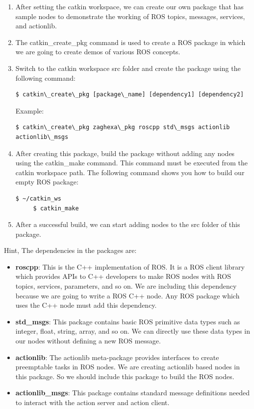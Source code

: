  \begin{enumerate}
 	\item After setting the catkin workspace, we can create our own package that has sample nodes to demonstrate the working of ROS topics, messages, services, and actionlib.
 	\item The catkin\_create\_pkg command is used to create a ROS package in which we are going to create demos of various ROS concepts.
 	\item Switch to the catkin workspace src folder and create the package using the following command: 
     \begin{lstlisting}[language=terCmd]
    $ catkin\_create\_pkg [package\_name] [dependency1] [dependency2]
     \end{lstlisting}
     Example:
      \begin{lstlisting}[language=terCmd]
 $ catkin\_create\_pkg zaghexa\_pkg roscpp std\_msgs actionlib actionlib\_msgs
     \end{lstlisting}

 	\item After creating this package, build the package without adding any nodes using the catkin\_make command. This command must be executed from the catkin workspace path. The following command shows you how to build our empty ROS package: 
       \begin{lstlisting}[language=terCmd]
     $ ~/catkin_ws
     $ catkin_make
     \end{lstlisting}
     

 	\item After a successful build, we can start adding nodes to the src folder of this package.
 \end{enumerate}
 Hint, The dependencies in the packages are:
 \begin{itemize}
 	\item \textbf{roscpp}: This is the C++ implementation of ROS. It is a ROS client library which provides APIs to C++ developers to make ROS nodes with ROS topics, services, parameters, and so on. We are including this dependency because we are going to write a ROS C++ node. Any ROS package which uses the C++ node must add this dependency.
 	\item \textbf{std\_msgs}: This package contains basic ROS primitive data types such as integer, float, string, array, and so on. We can directly use these data types in our nodes without defining a new ROS message.
 	\item \textbf{actionlib}: The actionlib meta-package provides interfaces to create preemptable tasks in ROS nodes. We are creating actionlib based nodes in this package. So we should include this package to build the ROS nodes.
 	\item \textbf{actionlib\_msgs}: This package contains standard message definitions needed to interact with the action server and action client.	
 \end{itemize}

